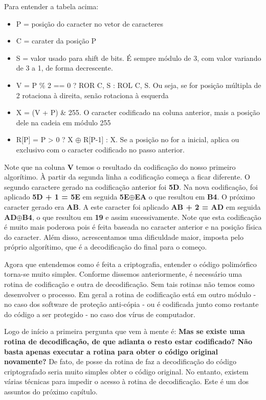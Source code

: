 Para entender a tabela acima:
\begin{itemize}
\item P = posição do caracter no vetor de caracteres
\item C = carater da posição P
\item S = valor usado para shift de bits. É sempre módulo de 3, com valor variando de 3 a 1, de forma decrescente.
\item V = P \% 2 == 0 ? ROR C, S : ROL C, S. Ou seja, se for posição múltipla de 2 rotaciona à direita, senão rotaciona à esquerda
\item X = (V + P) \& 255. O caracter codificado na coluna anterior, mais a posição dele na cadeia em módulo 255
\item R[P] = P > 0 ? X $ \oplus $ R[P-1] : X. Se a posição no for a inicial, aplica ou exclusivo com o caracter codificado no passo anterior.
\end{itemize}
Note que na coluna \textbf{V} temos o resultado da codificação do nosso primeiro algorítimo. À partir da segunda linha a codificação começa a ficar diferente. O segundo caractere gerado na codificação anterior foi \textbf{5D}. Na nova codificação, foi aplicado \textbf{5D + 1 = 5E} em seguida \textbf{5E$ \oplus $EA} o que resultou em \textbf{B4}. O próximo caracter gerado era \textbf{AB}. A este caracter foi aplicado \textbf{AB + 2 = AD} em seguida \textbf{AD$ \oplus $B4}, o que resultou em \textbf{19} e assim sucessivamente. Note que esta codificação é muito mais poderosa pois é feita baseada no caracter anterior e na posição física do caracter. Além disso, acrescentamos uma dificuldade maior, imposta pelo próprio algorítimo, que é a decodificação do final para o começo.

Agora que entendemos como é feita a criptografia, entender o código polimórfico torna-se muito simples. Conforme dissemos anteriormente, é necessário uma rotina de codificação e outra de decodificação. Sem tais rotinas não temos como desenvolver o processo. Em geral a rotina de codificação está em outro módulo - no caso dos software de proteção anti-cópia - ou é codificada junto como restante do código a ser protegido - no caso dos vírus de computador.

Logo de início a primeira pergunta que vem à mente é: \textbf{Mas se existe uma rotina de decodificação, de que adianta o resto estar codificado? Não basta apenas executar a rotina para obter o código original novamente?} De fato, de posse da rotina de faz a decodificação do código criptografado seria muito simples obter o código original. No entanto, existem várias técnicas para impedir o acesso à rotina de decodificação. Este é um dos assuntos do próximo capítulo.

